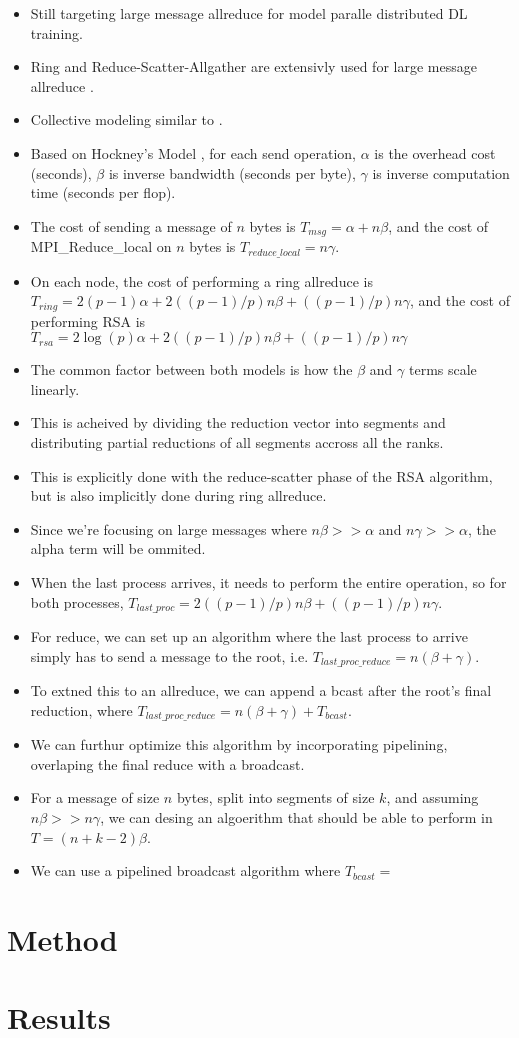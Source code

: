 \begin{itemize}
    \item Still targeting large message allreduce for model paralle distributed DL training.
    \item Ring and Reduce-Scatter-Allgather are extensivly used for large message allreduce \cite{MPICH, gabriel2004OpenMPI, UCC, NCCL}.
    \item Collective modeling similar to \cite{Thakur2005OptMPICH}.
    \item Based on Hockney's Model \cite{Hockney1994HockenyModel}, for each send operation, $\alpha$ is the overhead cost (seconds), $\beta$ is inverse bandwidth (seconds per byte), $\gamma$ is inverse computation time (seconds per flop). 
    \item The cost of sending a message of $n$ bytes is $T_{msg}=\alpha+n\beta$, and the cost of MPI\_Reduce\_local on $n$ bytes is $T_{reduce\_local}=n\gamma$.
    \item On each node, the cost of performing a ring allreduce is $T_{ring} = 2(p-1)\alpha + 2((p-1)/p)n\beta + ((p-1)/p)n\gamma$, and the cost of performing RSA is $T_{rsa} = 2\log(p)\alpha + 2((p-1)/p)n\beta + ((p-1)/p)n\gamma$
    \item The common factor between both models is how the $\beta$ and $\gamma$ terms scale linearly.
    \item This is acheived by dividing the reduction vector into segments and distributing partial reductions of all segments accross all the ranks.
    \item This is explicitly done with the reduce-scatter phase of the RSA algorithm, but is also implicitly done during ring allreduce.
    \item Since we're focusing on large messages where $n\beta >> \alpha$ and $n\gamma >> \alpha$, the alpha term will be ommited.
    
    \item When the last process arrives, it needs to perform the entire operation, so for both processes, $T_{last\_proc}=2((p-1)/p)n\beta + ((p-1)/p)n\gamma$.
    \item For reduce, we can set up an algorithm where the last process to arrive simply has to send a message to the root, i.e. $T_{last\_proc\_reduce}=n(\beta+\gamma)$.
    \item To extned this to an allreduce, we can append a bcast after the root's final reduction, where $T_{last\_proc\_reduce}=n(\beta+\gamma) + T_{bcast}$.
    \item We can furthur optimize this algorithm by incorporating pipelining, overlaping the final reduce with a broadcast.  
    \item For a message of size $n$ bytes, split into segments of size $k$, and assuming $n\beta >> n\gamma$, we can desing an algoerithm that should be able to perform in $T=(n+k-2)\beta$.
    \item We can use a pipelined broadcast algorithm where $T_{bcast} = $
\end{itemize}

\section{Method}


\section{Results}

